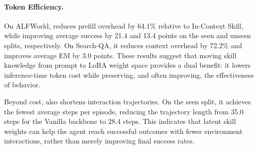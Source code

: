  
 
\paragraph{Token Efficiency.}
On ALFWorld, \method{} reduces prefill overhead by 64.1\% relative to In-Context Skill, while improving average success by 21.4 and 13.4 points on the seen and unseen splits, respectively. On Search-QA, it reduces context overhead by 72.2\% and improves average EM by 3.0 points. These results suggest that moving skill knowledge from prompt to LoRA weight space provides a dual benefit: it lowers inference-time token cost while preserving, and often improving, the effectiveness of behavior.

Beyond cost, \method{} also shortens interaction trajectories. On the seen split, it achieves the fewest average steps per episode, reducing the trajectory length from 35.0 steps for the Vanilla backbone to 28.4 steps. This indicates that latent skill weights can help the agent reach successful outcomes with fewer environment interactions, rather than merely improving final success rates.
 
